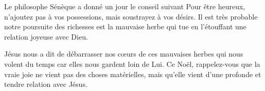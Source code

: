Le philosophe Sénèque a donné un jour le conseil suivant\frcolon{} \Og Pour être heureux, n'ajoutez pas à vos possessions, mais soustrayez à vos désirs. \Fg{} Il est très probable notre poursuite des richesses est la mauvaise herbe qui tue en l'étouffant une relation joyeuse avec Dieu.


Jésus nous a dit de débarrasser nos cœurs de ces mauvaises herbes qui nous volent du temps car elles nous gardent loin de Lui. Ce Noël, rappelez-vous que la vraie joie ne vient pas des choses matérielles, mais qu'elle vient d'une profonde et tendre relation avec Jésus.

\begin{dvquotes}

\end{dvquotes}

